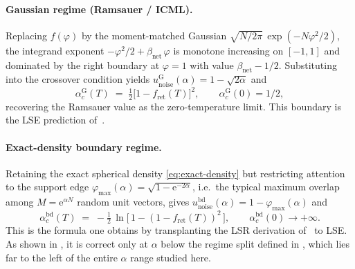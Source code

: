 \documentclass[11pt]{article}
\newcommand{\e}{{\mathrm{e}}}
\newcommand{\Bnet}{\beta_{\mathrm{net}}}
\newcommand{\fret}{f_{\mathrm{ret}}}
\newcommand{\acGauss}{\alpha_c^{\mathrm{G}}}
\newcommand{\acBd}{\alpha_c^{\mathrm{bd}}}
\begin{document}
\paragraph{Gaussian regime (Ramsauer / ICML).}
Replacing $f(\varphi)$ by the moment-matched Gaussian
$\sqrt{N/2\pi}\,\exp(-N\varphi^2/2)$, the integrand exponent
$-\varphi^2/2 + \Bnet\,\varphi$ is monotone increasing on $[-1,1]$ and
dominated by the right boundary at $\varphi = 1$ with value
$\Bnet - 1/2$. Substituting into the crossover condition yields
$u_{\mathrm{noise}}^{\mathrm{G}}(\alpha) = 1 - \sqrt{2\alpha}$ and
\begin{equation}
\acGauss(T) \;=\; \tfrac12\bigl[1 - \fret(T)\bigr]^2,
\qquad \acGauss(0) = 1/2,
\label{eq:acgauss}
\end{equation}
recovering the Ramsauer value as the zero-temperature limit. This boundary
is the LSE prediction of~\citep{icml2026theory}.

\paragraph{Exact-density boundary regime.}
Retaining the exact spherical density \eqref{eq:exact-density} but
restricting attention to the support edge
$\varphi_{\max}(\alpha) = \sqrt{1 - \e^{-2\alpha}}$, i.e.\ the typical
maximum overlap among $M = \e^{\alpha N}$ random unit vectors, gives
$u_{\mathrm{noise}}^{\mathrm{bd}}(\alpha) = 1 - \varphi_{\max}(\alpha)$ and
\begin{equation}
\acBd(T) \;=\; -\tfrac12\,\ln\!\bigl[\,1 - (1-\fret(T))^2\,\bigr],
\qquad \acBd(0) \to +\infty.
\label{eq:acbd}
\end{equation}
This is the formula one obtains by transplanting the LSR derivation
of~\citep{petrova2026metastable} to LSE. As shown in
, it is correct only at $\alpha$ below the
regime split defined in , which lies far to the
left of the entire $\alpha$ range studied here.
\end{document}
